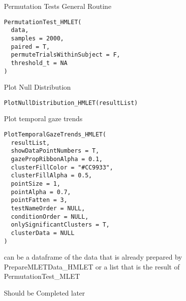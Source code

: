 \documentclass[a4paper]{book}
\begin{document}
%
\begin{Description}\relax
Permutation Tests General Routine
\end{Description}
%
\begin{Usage}
\begin{verbatim}
PermutationTest_HMLET(
  data,
  samples = 2000,
  paired = T,
  permuteTrialsWithinSubject = F,
  threshold_t = NA
)
\end{verbatim}
\end{Usage}
%
\begin{Description}\relax
Plot Null Distribution
\end{Description}
%
\begin{Usage}
\begin{verbatim}
PlotNullDistribution_HMLET(resultList)
\end{verbatim}
\end{Usage}
%
\begin{Description}\relax
Plot temporal gaze trends
\end{Description}
%
\begin{Usage}
\begin{verbatim}
PlotTemporalGazeTrends_HMLET(
  resultList,
  showDataPointNumbers = T,
  gazePropRibbonAlpha = 0.1,
  clusterFillColor = "#CC9933",
  clusterFillAlpha = 0.5,
  pointSize = 1,
  pointAlpha = 0.7,
  pointFatten = 3,
  testNameOrder = NULL,
  conditionOrder = NULL,
  onlySignificantClusters = T,
  clusterData = NULL
)
\end{verbatim}
\end{Usage}
%
\begin{Arguments}
\begin{ldescription}
\item[\code{resultList}] can be a dataframe of the data that is already prepared by PrepareMLETData\_HMLET or a list that is the result of PermutationTest\_MLET
\end{ldescription}
\end{Arguments}
%
\begin{Description}\relax
Should be Completed later
\end{Description}
\end{document}
